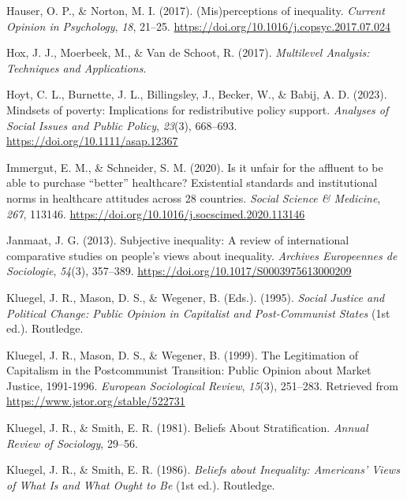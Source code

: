 \documentclass[
  12pt,
]{article}
\newlength{\cslhangindent}
\newenvironment{CSLReferences}[2] %
 {\begin{list}{}{%
  \setlength{\itemindent}{0pt}
  \setlength{\leftmargin}{0pt}
  \setlength{\parsep}{0pt}
  \ifodd #1
   \setlength{\leftmargin}{\cslhangindent}
   \setlength{\itemindent}{-1\cslhangindent}
  \fi
  \setlength{\itemsep}{#2\baselineskip}}}
 {\end{list}}
\begin{document}
\begin{CSLReferences}{1}{0}
Hauser, O. P., \& Norton, M. I. (2017). ({Mis})perceptions of
inequality. \emph{Current Opinion in Psychology}, \emph{18}, 21--25.
\url{https://doi.org/10.1016/j.copsyc.2017.07.024}

Hox, J. J., Moerbeek, M., \& Van de Schoot, R. (2017). \emph{Multilevel
{Analysis}: {Techniques} and {Applications}}.

Hoyt, C. L., Burnette, J. L., Billingsley, J., Becker, W., \& Babij, A.
D. (2023). Mindsets of poverty: {Implications} for redistributive policy
support. \emph{Analyses of Social Issues and Public Policy},
\emph{23}(3), 668--693. \url{https://doi.org/10.1111/asap.12367}

Immergut, E. M., \& Schneider, S. M. (2020). Is it unfair for the
affluent to be able to purchase {``better''} healthcare? {Existential}
standards and institutional norms in healthcare attitudes across 28
countries. \emph{Social Science \& Medicine}, \emph{267}, 113146.
\url{https://doi.org/10.1016/j.socscimed.2020.113146}

Janmaat, J. G. (2013). Subjective inequality: {A} review of
international comparative studies on people's views about inequality.
\emph{Archives Europeennes de Sociologie}, \emph{54}(3), 357--389.
\url{https://doi.org/10.1017/S0003975613000209}

Kluegel, J. R., Mason, D. S., \& Wegener, B. (Eds.). (1995).
\emph{Social {Justice} and {Political Change}: {Public Opinion} in
{Capitalist} and {Post-Communist States}} (1st ed.). Routledge.

Kluegel, J. R., Mason, D. S., \& Wegener, B. (1999). The {Legitimation}
of {Capitalism} in the {Postcommunist Transition}: {Public Opinion}
about {Market Justice}, 1991-1996. \emph{European Sociological Review},
\emph{15}(3), 251--283. Retrieved from
\url{https://www.jstor.org/stable/522731}

Kluegel, J. R., \& Smith, E. R. (1981). Beliefs {About Stratification}.
\emph{Annual Review of Sociology}, 29--56.

Kluegel, J. R., \& Smith, E. R. (1986). \emph{Beliefs about
{Inequality}: {Americans}' {Views} of {What Is} and {What Ought} to
{Be}} (1st ed.). Routledge.


\end{CSLReferences}
\end{document}
